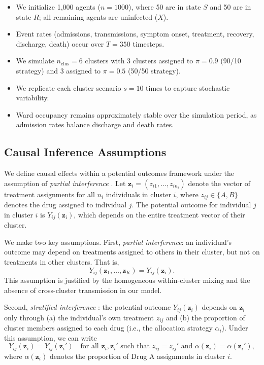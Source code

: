 \documentclass[preprint,11pt]{elsarticle}
\begin{document}
\begin{itemize}
  \item We initialize 1,000 agents ($n = 1000$), where 50 are in state $S$ and 50 are in state $R$; all remaining agents are uninfected ($X$).
  \item Event rates (admissions, transmissions, symptom onset, treatment, recovery, discharge, death) occur over $T = 350$ timesteps.
  \item We simulate $n_{\text{clus}} = 6$ clusters with 3 clusters assigned to $\pi = 0.9$ (90/10 strategy) and 3 assigned to $\pi = 0.5$ (50/50 strategy).
  \item We replicate each cluster scenario $s = 10$ times to capture stochastic variability.
  \item Ward occupancy remains approximately stable over the simulation period, as admission rates balance discharge and death rates.
\end{itemize}

\subsection{Causal Inference Assumptions}

We define causal effects within a potential outcomes framework under the assumption of \textit{partial interference} \citep{hudgens_toward_2008, sobel_what_2006}. Let $\mathbf{z}_i = (z_{i1}, \ldots, z_{in_i})$ denote the vector of treatment assignments for all $n_i$ individuals in cluster $i$, where $z_{ij} \in \{A, B\}$ denotes the drug assigned to individual $j$. The potential outcome for individual $j$ in cluster $i$ is $Y_{ij}(\mathbf{z}_i)$, which depends on the entire treatment vector of their cluster.

We make two key assumptions. First, \textit{partial interference}: an individual's outcome may depend on treatments assigned to others in their cluster, but not on treatments in other clusters. That is,
\begin{equation}
Y_{ij}(\mathbf{z}_1, \ldots, \mathbf{z}_K) = Y_{ij}(\mathbf{z}_i).
\end{equation}
This assumption is justified by the homogeneous within-cluster mixing and the absence of cross-cluster transmission in our model.

Second, \textit{stratified interference} \citep{hudgens_toward_2008}: the potential outcome $Y_{ij}(\mathbf{z}_i)$ depends on $\mathbf{z}_i$ only through (a) the individual's own treatment $z_{ij}$ and (b) the proportion of cluster members assigned to each drug (i.e., the allocation strategy $\alpha_i$). Under this assumption, we can write
\begin{equation}
Y_{ij}(\mathbf{z}_i) = Y_{ij}(\mathbf{z}_i') \quad \text{for all } \mathbf{z}_i, \mathbf{z}_i' \text{ such that } z_{ij} = z_{ij}' \text{ and } \alpha(\mathbf{z}_i) = \alpha(\mathbf{z}_i'),
\end{equation}
where $\alpha(\mathbf{z}_i)$ denotes the proportion of Drug A assignments in cluster $i$.
\end{document}

